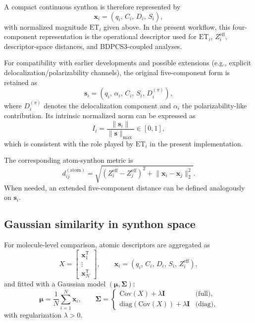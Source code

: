 \documentclass[journal=jctcce,manuscript=article]{achemso}
\begin{document}
A compact continuous synthon is therefore represented by
\begin{equation}
\mathbf{x}_i=(q_i,\,C_i,\,D_i,\,S_i),
\end{equation}
with normalized magnitude $\mathrm{ET}_i$ given above.
In the present workflow, this four-component representation is the operational descriptor used for $\mathrm{ET}_i$, $Z_i^{\mathrm{eff}}$, descriptor-space distances, and BDPCS3-coupled analyses.

For compatibility with earlier developments and possible extensions (e.g., explicit delocalization/polarizability channels), the original five-component form is retained as
\begin{equation}
\mathbf{s}_i=(q_i,\,\alpha_i,\,C_i,\,S_i,\,D_i^{(\pi)}),
\end{equation}
where $D_i^{(\pi)}$ denotes the delocalization component and $\alpha_i$ the polarizability-like contribution.
Its intrinsic normalized norm can be expressed as
\begin{equation}
I_i=\frac{\lVert\mathbf{s}_i\rVert}{\lVert\mathbf{s}\rVert_{\max}}\in[0,1],
\end{equation}
which is consistent with the role played by $\mathrm{ET}_i$ in the present implementation.

The corresponding atom-synthon metric is
\begin{equation}
d_{ij}^{(\mathrm{atom})}=
\sqrt{
\left(Z_i^{\mathrm{eff}}-Z_j^{\mathrm{eff}}\right)^2+
\lVert\mathbf{x}_i-\mathbf{x}_j\rVert_2^2
}.
\end{equation}
When needed, an extended five-component distance can be defined analogously on $\mathbf{s}_i$.

\subsection{Gaussian similarity in synthon space}
For molecule-level comparison, atomic descriptors are aggregated as
\begin{equation}
X=
\begin{bmatrix}
\mathbf{x}_1^\mathsf{T}\\
\vdots\\
\mathbf{x}_N^\mathsf{T}
\end{bmatrix},
\qquad
\mathbf{x}_i=(q_i,\,C_i,\,D_i,\,S_i,\,Z_i^{\mathrm{eff}}),
\end{equation}
and fitted with a Gaussian model $(\boldsymbol{\mu},\mathbf{\Sigma})$:
\begin{equation}
\boldsymbol{\mu}=\frac{1}{N}\sum_{i=1}^{N}\mathbf{x}_i,
\qquad
\mathbf{\Sigma}=
\begin{cases}
\mathrm{Cov}(X)+\lambda\mathbf{I} & \text{(full)},\\
\mathrm{diag}(\mathrm{Cov}(X))+\lambda\mathbf{I} & \text{(diag)},
\end{cases}
\end{equation}
with regularization $\lambda>0$.
\end{document}
